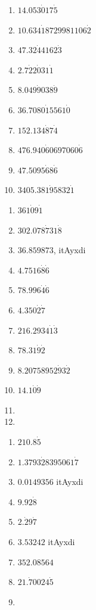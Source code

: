 \smallskip
{}

\begin{multicols}{3}
\begin{enumerate}[$(1)$]
\item $14.053\dot{0}17\dot{5}$
\item $10.634\dot{1}8729981106\dot{2}$
\item $47.32\dot{4}4162\dot{3}$
\item $2.7\dot{2}2\dot{0}31\dot{1}$
\item $8.049\dot{9}038\dot{9}$
\item $36.7080\dot{1}5561\dot{0}$
\item $152.134\dot{8}7 \dot{4}$
\item $476.940\dot{6}0697060\dot{6}$
\item $47.5095\dot{6}8 \dot{6}$
\item $3405.381\dot{9}5832\dot{1}$
\end{enumerate}
\end{multicols}


\begin{multicols}{3}
\begin{enumerate}[$(1)$]
\item $361\dot{0}9\dot{1}$
\item $302.078\dot{7}31\dot{8}$
\item $36.859873$, itAyxdi
\item $4.7516\dot{8} \dot{6}$
\item $78.996\dot{4}\dot{6}$
\item $4.350\dot{2}\dot{7}$
\item $216.2934\dot{1}\dot{3}$
\item $78.31\dot{9}\dot{2}$
\item $8.20758952\dot{9}3\dot{2}$
\item $14.1\dot{0}\dot{9}$
\item[]
\item[]
\end{enumerate}
\end{multicols}


\begin{multicols}{3}
\begin{enumerate}[$(1)$]
\item $210.8\dot{5}$
\item $1.3793\dot{2}8395061\dot{7}$
\item $0.0149356$ itAyxdi
\item $9.92\dot{8}$
\item $2.\dot{2}9\dot{7}$
\item $3.53242$ itAyxdi
\item $352.08564$
\item $21.\dot{7}0024\dot{5}$
\item[]
\end{enumerate}
\end{multicols}

